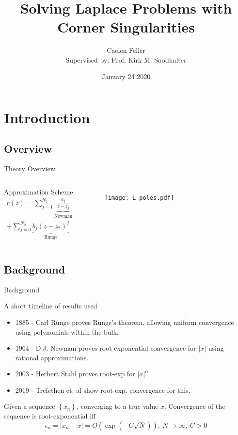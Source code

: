 \documentclass[envcountsect notes]{beamer}       %
\title[Solving Laplace Problems with Corner Singularities]{Solving Laplace Problems with Corner Singularities}
\author[Feller,Caelen]{Caelen Feller \\ \vspace{1cm} \footnotesize Supervised by: Prof. Kirk M. Soodhalter}
\date{January 24 2020}
\begin{document}
\frame{\titlepage}


\section{Introduction}
\subsection{Overview}
\begin{frame}{Theory Overview}
    \begin{columns}
        \begin{block}{Approximation Scheme}
            \begin{gather*}
                r(z) = \sum^{N_1}_{j=1} \underbrace{\frac{a_j}{z - z_j}}_{\text{Newman}} 
                \\+ \sum^{N_2}_{j=0}\underbrace{b_j(z-z_*)^j}_{\text{Runge}}
            \end{gather*}
        \end{block}
        \begin{figure}[t]
            \texttt{[image: L\_poles.pdf]}
        \end{figure}
    \end{columns}
\end{frame}

\subsection{Background}
\begin{frame}{Background}
    \begin{block}{A short timeline of results used}
    \begin{itemize}
        \item 1885 - Carl Runge proves Runge's theorem, allowing uniform convergence using polynomials within the bulk.
        \item 1964 - D.J. Newman proves root-exponential convergence for $\lvert x \rvert$ using rational approximations.
        \item 2003 - Herbert Stahl proves root-exp for $\lvert x \rvert ^\alpha$
        \item 2019 - Trefethen et. al show root-exp. convergence for this.
    \end{itemize}
    \end{block}
    \begin{definition}
        Given a sequence $\left\{x_n\right\}$, converging to a true value $x$.
        Convergence of the sequence is root-exponential iff 
        $$\epsilon_n = \lvert x_n - x \rvert = O\left(\exp\left(-C\sqrt{N}\right)\right),\ N \rightarrow \infty,\ C > 0$$ 
    \end{definition}   
\end{frame}
\end{document}
